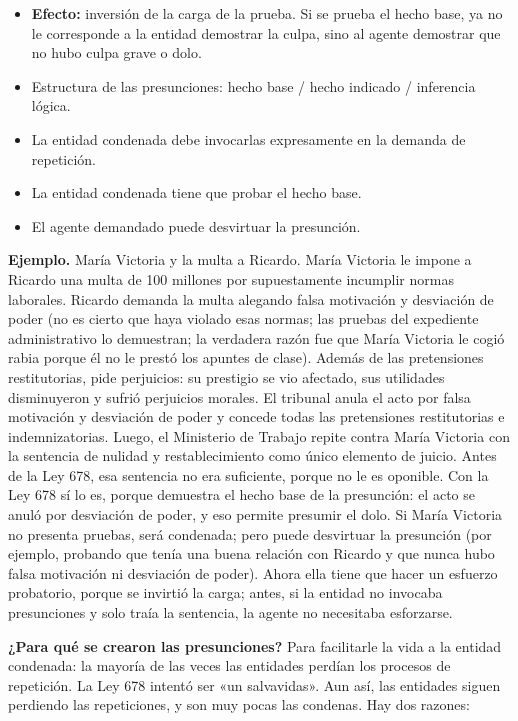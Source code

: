 \begin{itemize}
\item \textbf{Efecto:} inversión de la carga de la prueba. Si se prueba el hecho base, ya no le corresponde a la entidad demostrar la culpa, sino al agente demostrar que no hubo culpa grave o dolo.
\item Estructura de las presunciones: hecho base / hecho indicado / inferencia lógica.
\item La entidad condenada debe invocarlas expresamente en la demanda de repetición.
\item La entidad condenada tiene que probar el hecho base.
\item El agente demandado puede desvirtuar la presunción.
\end{itemize}
\begin{ejemplo}
\textcolor[HTML]{4F6228}{\textbf{Ejemplo. }}María Victoria y la multa a Ricardo. María Victoria le impone a Ricardo una multa de 100 millones por supuestamente incumplir normas laborales. Ricardo demanda la multa alegando falsa motivación y desviación de poder (no es cierto que haya violado esas normas; las pruebas del expediente administrativo lo demuestran; la verdadera razón fue que María Victoria le cogió rabia porque él no le prestó los apuntes de clase). Además de las pretensiones restitutorias, pide perjuicios: su prestigio se vio afectado, sus utilidades disminuyeron y sufrió perjuicios morales. El tribunal anula el acto por falsa motivación y desviación de poder y concede todas las pretensiones restitutorias e indemnizatorias. Luego, el Ministerio de Trabajo repite contra María Victoria con la sentencia de nulidad y restablecimiento como único elemento de juicio. Antes de la Ley 678, esa sentencia no era suficiente, porque no le es oponible. Con la Ley 678 sí lo es, porque demuestra el hecho base de la presunción: el acto se anuló por desviación de poder, y eso permite presumir el dolo. Si María Victoria no presenta pruebas, será condenada; pero puede desvirtuar la presunción (por ejemplo, probando que tenía una buena relación con Ricardo y que nunca hubo falsa motivación ni desviación de poder). Ahora ella tiene que hacer un esfuerzo probatorio, porque se invirtió la carga; antes, si la entidad no invocaba presunciones y solo traía la sentencia, la agente no necesitaba esforzarse.
\end{ejemplo}
\textbf{¿Para qué se crearon las presunciones?} Para facilitarle la vida a la entidad condenada: la mayoría de las veces las entidades perdían los procesos de repetición. La Ley 678 intentó ser «un salvavidas». Aun así, las entidades siguen perdiendo las repeticiones, y son muy pocas las condenas. Hay dos razones:

